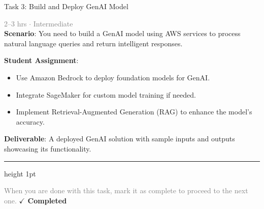 \documentclass[10pt,a4paper]{article}
\begin{document}
\begin{taskbox}{Task 3: Build and Deploy GenAI Model}

    {\small \textcolor{gray}{2--3 hrs $\cdot$ Intermediate}}\\[12pt]

    \textbf{Scenario}: You need to build a GenAI model using AWS services to process natural language queries and return intelligent responses.  

\textbf{Student Assignment}:  
\begin{itemize}
    \item Use Amazon Bedrock to deploy foundation models for GenAI.  
    \item Integrate SageMaker for custom model training if needed.  
    \item Implement Retrieval-Augmented Generation (RAG) to enhance the model’s accuracy.  
\end{itemize}

\textbf{Deliverable}: A deployed GenAI solution with sample inputs and outputs showcasing its functionality.\par

    \vspace{16pt}

    \textcolor{cardBorder}{\hrule height 1pt}\vspace{8pt}

    \small \textcolor{gray}{When you are done with this task, mark it as complete to proceed to the next one.} \hfill \textbf{\textcolor{brandDark}{$\checkmark$ Completed}}

\end{taskbox}
\end{document}

